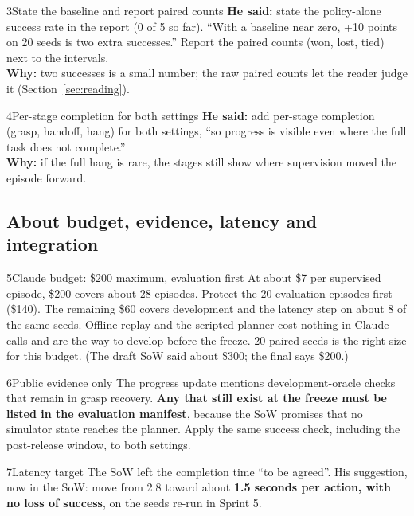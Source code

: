 \documentclass[11pt,a4paper]{article}
\begin{document}
\begin{ask}{3}{State the baseline and report paired counts}
\textbf{He said:} state the policy-alone success rate in the report (0 of 5 so far). ``With a baseline near zero,
+10 points on 20 seeds is two extra successes.'' Report the paired counts (won, lost, tied) next to the intervals.\\[2pt]
\textbf{Why:} two successes is a small number; the raw paired counts let the reader judge it (Section~\ref{sec:reading}).
\end{ask}

\begin{ask}{4}{Per-stage completion for both settings}
\textbf{He said:} add per-stage completion (grasp, handoff, hang) for both settings, ``so progress is visible even where
the full task does not complete.''\\[2pt]
\textbf{Why:} if the full hang is rare, the stages still show where supervision moved the episode forward.
\end{ask}

\subsection{About budget, evidence, latency and integration}

\begin{ask}{5}{Claude budget: \$200 maximum, evaluation first}
At about \$7 per supervised episode, \$200 covers about 28 episodes. Protect the 20 evaluation episodes first (\$140).
The remaining \$60 covers development and the latency step on about 8 of the same seeds. Offline replay and the scripted
planner cost nothing in Claude calls and are the way to develop before the freeze. 20 paired seeds is the right size for
this budget. (The draft SoW said about \$300; the final says \$200.)
\end{ask}

\begin{ask}{6}{Public evidence only}
The progress update mentions development-oracle checks that remain in grasp recovery. \textbf{Any that still exist at the
freeze must be listed in the evaluation manifest}, because the SoW promises that no simulator state reaches the planner.
Apply the same success check, including the post-release window, to both settings.
\end{ask}

\begin{ask}{7}{Latency target}
The SoW left the completion time ``to be agreed''. His suggestion, now in the SoW: move from 2.8 toward about
\textbf{1.5 seconds per action, with no loss of success}, on the seeds re-run in Sprint 5.
\end{ask}
\end{document}
